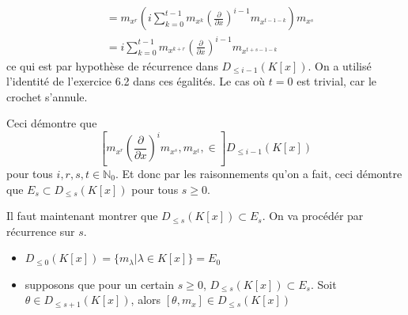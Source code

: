 \documentclass[french]{article}
\newcommand{\mdx}[1]{\left(\frac{\partial}{\partial x}\right)^{#1}}
\newcommand{\DK}[1]{D_{\leq #1} (K[x])}
\newcommand{\N}{\mathbb{N}}
\newcommand{\lie}[2]{\left[#1, #2\right]}
\begin{document}
\begin{enumerate}
\begin{itemize}
\begin{align*}
				&= m_{x^r}\left(
					i\sum_{k=0}^{t - 1}m_{x^k}\mdx{i-1}m_{x^{t - 1 - k}}
				\right)m_{x^s}\\
				&= i\sum_{k=0}^{t - 1}m_{x^{k + r}}\mdx{i-1}m_{x^{t + s - 1 - k}}
			\end{align*}
			ce qui est par hypothèse de récurrence dans $\DK{i - 1}$.
			On a utilisé l'identité de l'exercice 6.2 dans ces égalités.
			Le cas où $t = 0$ est trivial, car le crochet s'annule.
		\end{itemize}
		Ceci démontre que 
		\begin{equation*}
			\lie{m_{x^r}\mdx{i}m_{x^s}, m_{x^t}} \in \DK{i-1}
		\end{equation*}
		pour tous $i, r, s, t \in \N_0$.
		Et donc par les raisonnements qu'on a fait, ceci démontre que $E_s \subset
		\DK{s}$ pour tous $s\geq 0$.

		Il faut maintenant montrer que $\DK{s} \subset E_s$.
		On va procédér par récurrence sur $s$.
		\begin{itemize}
			\item $\DK{0} = \{m_\lambda | \lambda \in K[x]\} = E_0$
			\item supposons que pour un certain $s \geq 0$,
				$\DK{s} \subset E_s$.
				Soit $\theta \in \DK{s + 1}$, alors
				$\lie{\theta}{m_x} \in \DK{s}$
		\end{itemize}
\end{enumerate}
\end{document}
